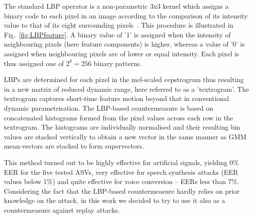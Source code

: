 The standard LBP operator is a non-parametric 3x3 kernel which assigns a binary code to each pixel in an image according to the comparison of its intensity value to that of its eight surrounding pixels~\cite{Ojala2002}. This procedure is illustrated in Fig.~\ref{fig:LBPfeature}.  A binary value of '1' is assigned when the intensity of neighbouring pixels (here feature components) is higher, whereas a value of '0' is assigned when neighbouring pixels are of lower or equal intensity. Each pixel is thus assigned one of $2^8=256$ binary patterns.

LBPs are determined for each pixel in the mel-scaled cepstrogram thus resulting in a new matrix of reduced dynamic range, here referred to as a 'textrogram'.  The textrogram captures short-time feature motion beyond that in conventional dynamic parametrisation.  The LBP-based countermeasure is based on concatenated histograms formed from the pixel values across each row in the textrogram.  The histograms are individually normalised and their resulting bin values are stacked vertically to obtain a new vector in the same manner as GMM mean-vectors are stacked to form supervectors.  

This method turned out to be  highly effective for artificial signals, yielding 0\% EER for the five tested ASVs, very effective for speech synthesis attacks (EER values below 1\%) and quite effective for voice conversion -- EERs less than 7\%. Considering the fact that the LBP-based countermeasure hardly relies on prior knowledge on the attack, in this work we decided to try to use it also as a countermeasure against replay attacks.



